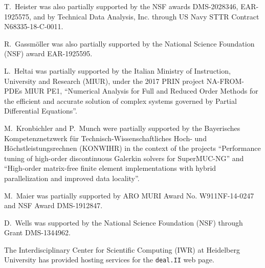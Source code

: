 \documentclass{ansarticle-preprint}
\newcommand{\specialword}[1]{\texttt{#1}}
\newcommand{\dealii}{{\specialword{deal.II}}\xspace}
\begin{document}
T.~Heister was also partially supported by the NSF awards
DMS-2028346, EAR-1925575, and by
Technical Data Analysis, Inc. through US Navy STTR Contract N68335-18-C-0011.

R.~Gassm{\"o}ller was also partially supported by the National Science
Foundation (NSF) award EAR-1925595.

L.~Heltai was partially supported by the Italian Ministry of Instruction,
University and Research (MIUR), under the 2017 PRIN project NA-FROM-PDEs MIUR
PE1, ``Numerical Analysis for Full and Reduced Order Methods for the efficient
and accurate solution of complex systems governed by Partial Differential
Equations''.

M.~Kronbichler and P.~Munch were partially supported by the
Bayerisches Kompetenznetzwerk
f\"ur Technisch-Wissen\-schaft\-li\-ches Hoch- und H\"ochstleistungsrechnen
(KONWIHR) in the context of the projects
``Performance tuning of high-order discontinuous Galerkin solvers for
SuperMUC-NG'' and ``High-order matrix-free finite element implementations with
hybrid parallelization and improved data locality''.

M.~Maier was partially supported by ARO MURI Award No. W911NF-14-0247 and
NSF Award DMS-1912847.

D.~Wells was supported by the National Science Foundation (NSF) through Grant
DMS-1344962.

The Interdisciplinary Center for Scientific Computing (IWR) at Heidelberg
University has provided hosting services for the \dealii{} web page.


{}

\end{document}
